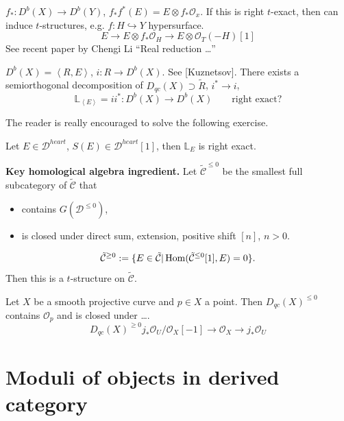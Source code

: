 \begin{example}
\label{example-right}
$f_*:D^b(X) \to D^b(Y)$, $f_*f^*(E)=E\otimes
f_*\mathcal{O}_x$. If this is right
$t$-exact, then can induce $t$-structures,
e.g. $f:H \hookrightarrow Y$ hypersurface.
$$
E \to E \otimes f_*\mathcal{O}_H\to E\otimes
\mathcal{O}_T(-H)[1]
$$
See recent paper by Chengi Li ``Real
reduction \ldots{}''
\end{example}

\begin{example}
\label{example-Kuznetsov}
$D^b(X)=\left\langle{}R,E\right\rangle{}$, $i:R \to D^b(X)$.
See [Kuznetsov]. There exists a
semiorthogonal decomposition of $D_{qc}(X)
\supset \tilde{R}$, $i^* \to i$,
$$
\mathbb{L}_{\left\langle{}E\right\rangle{}}=ii^* :D^b(X) \to
D^b(X)\qquad \text{right exact?}
$$
\end{example}

The reader is really encouraged to solve the
following exercise.

\begin{exercise}
\label{exercise-right-exact}
Let $E \in \mathcal{D}^{heart}$, $S(E) \in
\mathcal{D}^{heart}[1]$, then $\mathbb{L}_E$
is right exact.
\end{exercise}

\noindent
{\bf Key homological algebra ingredient.} Let
$\tilde{\mathcal{C}}^{\leq 0}$ be the
smallest full subcategory of
$\tilde{\mathcal{C}}$ that
\begin{itemize}
\item contains $G(\mathcal{D}^{\leq 0})$,
\item is closed under direct sum, extension,
positive shift $[n]$, $n>0$.
\end{itemize}
$$
\tilde{\mathcal{C}}^{\geq 0}:=\{E \in
\tilde{\mathcal{C}}|
\mathop{\mathrm{Hom}}\nolimits(\tilde{\mathcal{C}}^{\leq 0}[1],E)=0\}.
$$
Then this is a $t$-structure on
$\tilde{\mathcal{C}}$.

\begin{example}
\label{example-curve}
Let $X$ be a smooth projective curve and $p
\in X$ a point. Then $D_{qc}(X)^{\leq 0}$
contains $\mathcal{O}_p$ and is closed under
\ldots{}.
$$
D_{qc}(X)^{\geq 0}j_*
\mathcal{O}_U/\mathcal{O}_X[-1] \to
\mathcal{O}_X \to j_*\mathcal{O}_U
$$
\end{example}

\section{Moduli of objects in derived
category}
\label{nasak-label-005}

